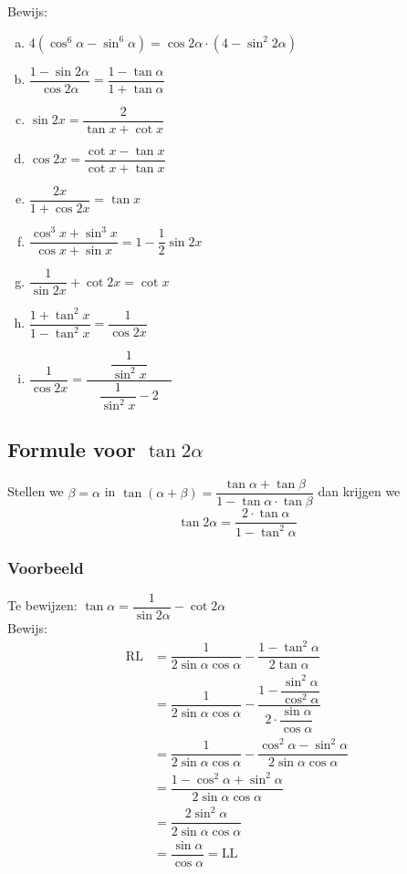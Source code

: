 \documentclass[a4paper,12pt]{article}
\begin{document}
\begin{oefening} %
Bewijs:
\begin{enumerate}[(a)]
  \itemsep.5em
  \item $\displaystyle 4(\cos^6\alpha-\sin^6\alpha)=\cos 2\alpha \cdot(4 - \sin^2 2\alpha)$
  \item $\displaystyle \dfrac{1-\sin 2\alpha}{\cos 2\alpha}=\dfrac{1-\tan\alpha}{1+\tan\alpha}$
  \item $\displaystyle \sin 2x = \dfrac{2}{\tan x + \cot x}$
  \item $\displaystyle \cos 2x = \dfrac{\cot x - \tan x}{\cot x + \tan x}$
  \item $\displaystyle \dfrac{2x}{1+\cos 2x} = \tan x$
  \item $\displaystyle \dfrac{\cos^3 x + \sin^3 x}{\cos x + \sin x} = 1 - \dfrac{1}{2}\sin 2x$
  \item $\displaystyle \dfrac{1}{\sin 2x} + \cot 2x = \cot x$
  \item $\displaystyle \dfrac{1 + \tan^2x}{1 - \tan^2x} = \dfrac{1}{\cos 2x}$
  \item $\displaystyle \dfrac{1}{\cos 2x} = \dfrac{\dfrac{1}{\sin^2x}}{\quad\dfrac{1}{\sin^2x}-2\quad}$
\end{enumerate}
\end{oefening}

\begin{theorie}

\subsection{Formule voor $\tan 2\alpha$}

Stellen we $\beta=\alpha$ in $\tan(\alpha + \beta)=\dfrac{\tan\alpha + \tan\beta}{1-\tan\alpha\cdot\tan\beta}$ dan krijgen we
$$\tan 2\alpha = \dfrac{2\cdot \tan\alpha}{1-\tan^2\alpha}$$

\subsubsection*{Voorbeeld}

Te bewijzen: $\tan\alpha = \dfrac{1}{\sin 2\alpha} - \cot 2\alpha$\\
Bewijs:
\begin{align*}
  \mbox{RL} &= \dfrac{1}{2\sin\alpha \cos\alpha}-\dfrac{1-\tan^2\alpha}{2\tan\alpha}\\
            &= \dfrac{1}{2\sin\alpha \cos\alpha}-\dfrac{1-\dfrac{\sin^2\alpha}{\cos^2\alpha}}{2\cdot \dfrac{\sin\alpha}{\cos\alpha}}\\
            &= \dfrac{1}{2\sin\alpha \cos\alpha}-\dfrac{\cos^2\alpha - \sin^2\alpha}{2\sin\alpha\cos\alpha}\\
            &= \dfrac{1 - \cos^2\alpha + \sin^2\alpha}{2\sin\alpha \cos\alpha}\\
            &= \dfrac{2\sin^2\alpha}{2\sin\alpha \cos\alpha}\\
            &= \dfrac{\sin\alpha}{\cos\alpha} = \mbox{LL}\\
\end{align*}

\end{theorie}
\end{document}
